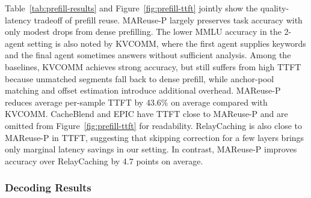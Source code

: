 \documentclass[letterpaper]{article} %
\begin{document}
Table~\ref{tab:prefill-results} and Figure~\ref{fig:prefill-ttft} jointly show the quality-latency tradeoff of prefill reuse. MAReuse-P largely preserves task accuracy with only modest drops from dense prefilling. The lower MMLU accuracy in the 2-agent setting is also noted by KVCOMM, where the first agent supplies keywords and the final agent sometimes answers without sufficient analysis. Among the baselines, KVCOMM achieves strong accuracy, but still suffers from high TTFT because unmatched segments fall back to dense prefill, while anchor-pool matching and offset estimation introduce additional overhead. MAReuse-P reduces average per-sample TTFT by 43.6\% on average compared with KVCOMM. CacheBlend and EPIC have TTFT close to MAReuse-P and are omitted from Figure~\ref{fig:prefill-ttft} for readability. RelayCaching is also close to MAReuse-P in TTFT, suggesting that skipping correction for a few layers brings only marginal latency savings in our setting. In contrast, MAReuse-P improves accuracy over RelayCaching by 4.7 points on average.

\subsubsection{Decoding Results}
\end{document}
